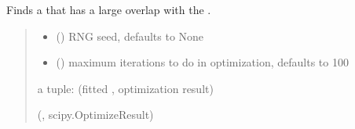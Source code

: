 \documentclass[letterpaper,10pt,english]{sphinxmanual}
\begin{document}
\begin{fulllineitems}
\begin{fulllineitems}
\label{\detokenize{spinbox:spinbox.core.HilbertState.nearby_product_state}}
\pysigstartsignatures
{}
\pysigstopsignatures
\sphinxAtStartPar
Finds a  that has a large overlap with the .
\begin{quote}\begin{description}
\begin{itemize}
\item {} 
\sphinxAtStartPar
{} (\sphinxstyleliteralemphasis{\sphinxupquote{, }}) \textendash{} RNG seed, defaults to None

\item {} 
\sphinxAtStartPar
{} (\sphinxstyleliteralemphasis{\sphinxupquote{, }}) \textendash{} maximum iterations to do in optimization, defaults to 100

\end{itemize}

\sphinxAtStartPar
a tuple: (fitted , optimization result)

\sphinxAtStartPar
({\hyperref[\detokenize{spinbox:spinbox.core.ProductState}]{}}, scipy.OptimizeResult)

\end{description}\end{quote}

\end{fulllineitems}



\end{fulllineitems}
\end{document}
